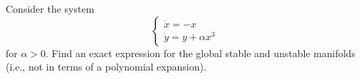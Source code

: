 \documentclass[12pt]{report}
\begin{document}
\newpage




\begin{problem}
    Consider the system 
\begin{equation}
\left\{\begin{array}{l}
\dot x= -x \\
\dot y = y + \alpha x^3 
\end{array}\right.
\end{equation}
for $\alpha>0$.  Find an exact expression for the global stable and unstable manifolds (i.e., not in terms of a polynomial expansion).
\end{problem}
\end{document}
